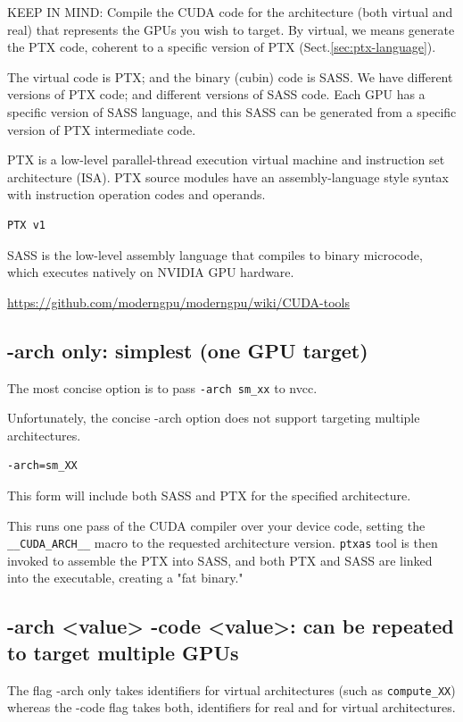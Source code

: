 KEEP IN MIND: Compile the CUDA code for the architecture (both virtual and real)
that represents the GPUs you wish to target. By virtual, we means generate the
PTX code, coherent to a specific version of PTX (Sect.\ref{sec:ptx-language}).

The virtual code is PTX; and the binary (cubin) code is SASS. We have different
versions of PTX code; and different versions of SASS code.
Each GPU has a specific version of SASS language, and this SASS can be generated
from a specific version of PTX intermediate code.

PTX is a low-level parallel-thread execution virtual machine and instruction set architecture (ISA).
PTX source modules have an assembly-language style syntax with instruction operation codes and operands.
\begin{verbatim}
PTX v1
\end{verbatim}

SASS is the low-level assembly language that compiles to binary microcode, which
executes natively on NVIDIA GPU hardware.

\url{https://github.com/moderngpu/moderngpu/wiki/CUDA-tools}

\subsection{-arch only: simplest (one GPU target)}

The most concise option is to pass \verb!-arch sm_xx! to nvcc.

Unfortunately, the concise -arch option does not support targeting multiple
architectures.


\begin{verbatim}
-arch=sm_XX 
\end{verbatim}
This form will include both SASS and PTX for the specified architecture.

This runs one pass of the CUDA compiler over your device code, setting the
\verb!__CUDA_ARCH__! macro to the requested architecture version. \verb!ptxas!
tool is then invoked to assemble the PTX into SASS, and both PTX and SASS are
linked into the executable, creating a "fat binary."


\subsection{-arch <value> -code <value>: can be repeated to target multiple GPUs}

The flag -arch only takes identifiers for virtual architectures (such as
\verb!compute_XX!) whereas the -code flag takes both, identifiers for real and for
virtual architectures.


